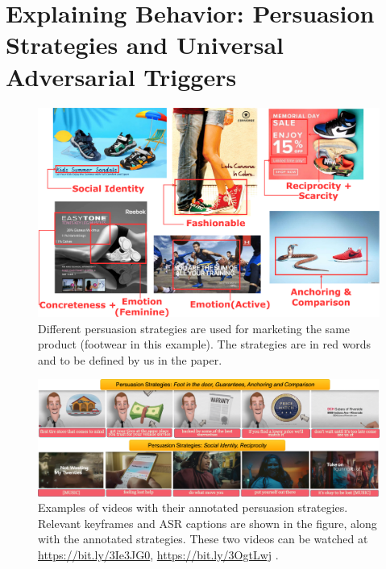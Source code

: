 \chapter{Explaining Behavior: Persuasion Strategies and Universal Adversarial Triggers}
\label{chatper:Explaining Behavior: Persuasion Strategies}


\begin{figure}[t]
    \centering
    \includegraphics[scale=0.08]{images/footwear-strategies.pdf}
    \caption{Different persuasion strategies are used for marketing the same product (footwear in this example). The strategies are in red words and to be defined by us in the paper.}
    \label{fig:footwear-strategies}
\end{figure}


\begin{figure}[!ht]
    \centering
    \includegraphics[width=\textwidth]{images/persuasion-strategies-videos.png}
    \caption{Examples of videos with their annotated persuasion strategies. Relevant keyframes and ASR captions are shown in the figure, along with the annotated strategies. These two videos can be watched at 
    \url{https://bit.ly/3Ie3JG0}, \url{https://bit.ly/3OgtLwj}
    .}
    \label{fig:persuasion-strategy-dataset-examples}
\end{figure}




